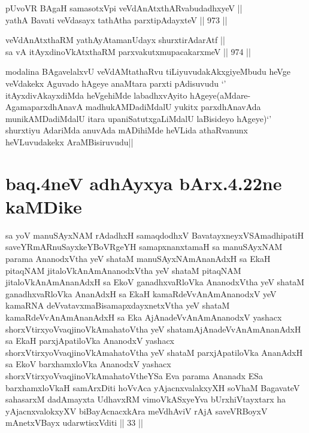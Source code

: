 \begin{shl}
pUvoVR BAgaH samasotxV\s pi veVdAnAtxthARvabudadhxyeV || \\
yathA Bavati veVdasayx tathA\s tha parxtipAdayxteV ||  973 ||  
\end{shl}
				
\begin{shl}
veVdAnAtxthaRM yathAyAtamanUdayx shurxtirAdarAtf || \\
sa vA itAyxdinoVkAtxthaRM parxvakutxmupacakarxmeV ||  974 ||  
\end{shl}


\begin{artha}
modalina BAgavelalxvU veVdAMtathaRvu tiLiyuvudakAkxgiyeMbudu heVge veVdakekx Aguvado hAgeye anaMtara parxti pAdisuvudu `\stext' itAyxdivAkayxdiMda heVgehiMde labadhxvAyito hAgeye(aMdare- AgamaparxdhAnavA madhukAMDadiMdalU yukitx parxdhAnavAda munikAMDadiMdalU itara upaniSatutxgaLiMdalU laBisideyo hAgeye)`\stext' shurxtiyu AdariMda anuvAda mADihiMde heVLida athaRvanunx heVLuvudakekx AraMBisiruvudu||
\end{artha}

\section*{baq.4neV adhAyxya bArx.4.22ne kaMDike}

\begin{shl}
sa yoV manuSAyxNAM rAdadhxH samaqdodhxV BavatayxneyxVSAmadhipatiH saveYRmARnuSayxkeYBoVRgeYH samapxnanxtamaH sa manuSAyxNAM parama AnanodxV\s tha yeV shataM manuSAyxNAmAnanAdxH sa EkaH pitaqNAM jitaloVkAnAmAnanodxV\s tha yeV shataM pitaqNAM jitaloVkAnAmAnanAdxH sa EkoV ganadhxvaRloVka AnanodxV\s tha yeV shataM ganadhxvaRloVka AnanAdxH sa EkaH kamaRdeVvAnAmAnanodxV yeV kamaRNA deVvatavxmaBisamapxdayxnetxV\s tha yeV shataM kamaRdeVvAnAmAnanAdxH sa Eka AjAnadeVvAnAmAnanodxV yashacx shorxVtirxyoV\s vaqjinoV\s kAmahatoV\s tha yeV shatamAjAnadeVvAnAmAnanAdxH sa EkaH parxjApatiloVka AnanodxV yashacx shorxVtirxyoV\s vaqjinoV\s kAmahatoV\s tha yeV shataM parxjApatiloVka AnanAdxH sa EkoV barxhamxloVka AnanodxV yashacx shorxVtirxyoV\s vaqjinoV\s kAmahatoV\s theYSa Eva parama Ananadx ESa barxhamxloVkaH samArxDiti hoVvAca yAjacnxvalakxyXH soVhaM BagavateV sahasarxM dadAmayxta UdhavxRM vimoVkASxyeYva bUrxhiVtayxtarx ha yAjacnxvalokxyXV biBayAcnacxkAra meVdhAviV rAjA saveVRBoyxV mAnetxVBayx udarwtisxVditi || 33 ||
\end{shl}

